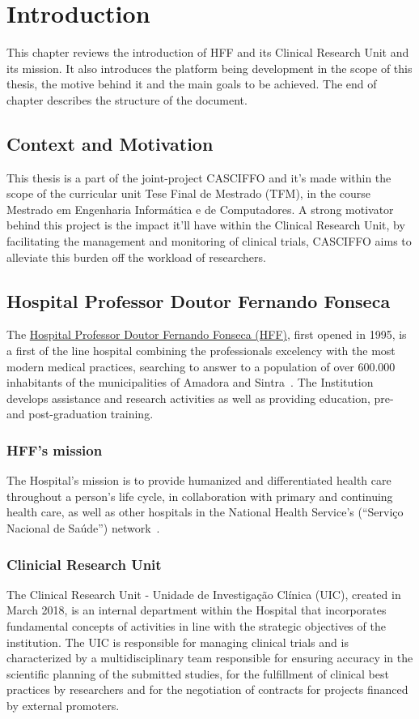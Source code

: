 \chapter{Introduction}
\label{ch:intro}
This chapter reviews the introduction of HFF and its Clinical Research Unit and its mission. It also introduces the platform being development in the scope of this thesis, the motive behind it and the main goals to be achieved. The end of chapter describes the structure of the document.

\section{Context and Motivation}
This thesis is a part of the joint-project CASCIFFO and it's made within the scope of the curricular unit Tese Final de Mestrado (TFM), in the course Mestrado em Engenharia Informática e de Computadores. A strong motivator behind this project is the impact it'll have within the Clinical Research Unit, by facilitating the management and monitoring of clinical trials, CASCIFFO aims to alleviate this burden off the workload of researchers.

\section{Hospital Professor Doutor Fernando Fonseca}
\label{ch:intro:sec:intro}

The \href{https://hff.min-saude.pt/}{Hospital Professor Doutor Fernando Fonseca (HFF)}, first opened in 1995, is a first of the line hospital combining the professionals excelency with the most modern medical practices, searching to answer to a population of over 600.000 inhabitants of the municipalities of Amadora and Sintra~\cite{hff-intro}. The Institution develops assistance and research activities as well as providing education, pre- and post-graduation training.

\subsection{HFF's mission}
The Hospital's mission is to provide humanized and differentiated health
care throughout a person's life cycle, in collaboration with primary and
continuing health care, as well as other hospitals in the National
Health Service's (``Serviço Nacional de Saúde'') network~\cite{hff-uic}.

\subsection{Clinicial Research Unit}
The Clinical Research Unit - Unidade de Investigação Clínica
(UIC), created in March 2018, is an internal department within the
Hospital that incorporates fundamental concepts of activities in line
with the strategic objectives of the institution. The UIC is responsible
for managing clinical trials and is characterized by a
multidisciplinary team responsible for ensuring accuracy in the
scientific planning of the submitted studies, for the fulfillment of
clinical best practices by researchers and for the negotiation of
contracts for projects financed by external promoters.\\

